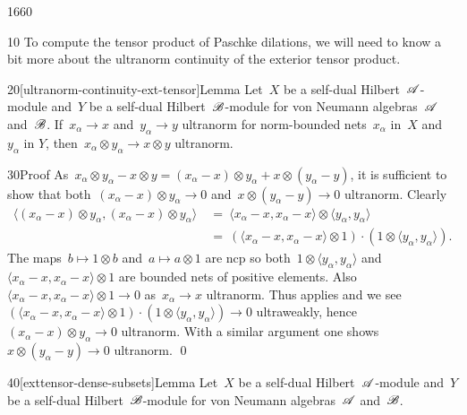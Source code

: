 \begin{parsec}{1660}%
\begin{point}{10}%
To compute the tensor product of Paschke dilations,
    we will need to know a bit more about
    the ultranorm continuity of the exterior tensor product.
\end{point}
\begin{point}{20}[ultranorm-continuity-ext-tensor]{Lemma}%
Let~$X$ be a self-dual Hilbert~$\mathscr{A}$-module
    and~$Y$ be a self-dual Hilbert~$\mathscr{B}$-module
    for von Neumann algebras~$\mathscr{A}$ and~$\mathscr{B}$.
If~$x_\alpha \to x$ and~$y_\alpha \to y$ ultranorm
    for norm-bounded nets~$x_\alpha$ in~$X$ and~$y_\alpha$ in $Y$,
    then~$x_\alpha \otimes y_\alpha \to x \otimes y$ ultranorm.
\begin{point}{30}{Proof}%
As~$x_\alpha \otimes y_\alpha - x \otimes y
            = (x_\alpha -x )\otimes y_\alpha + x\otimes (y_\alpha - y)$,
            it is sufficient
    to show that both~$(x_\alpha -x) \otimes y_\alpha \to 0$
    and~$x\otimes (y_\alpha - y) \to 0$ ultranorm.
Clearly
\begin{align*}
    \langle (x_\alpha - x) \otimes y_\alpha,
        (x_\alpha - x) \otimes y_\alpha \rangle
    & \ = \ 
    \langle x_\alpha - x , x_\alpha - x \rangle\otimes 
    \langle y_\alpha ,y_\alpha \rangle \\
    & \ = \ 
    (\langle x_\alpha - x , x_\alpha - x \rangle\otimes 1) \cdot (1 \otimes 
    \langle y_\alpha ,y_\alpha \rangle ).
\end{align*}
The maps~$b \mapsto 1 \otimes b$ and~$a \mapsto a \otimes 1$
    are ncp %
    so both~$1 \otimes \langle y_\alpha, y_\alpha \rangle$
    and~$\langle x_\alpha - x , x_\alpha - x \rangle\otimes 1$
    are bounded nets of positive elements.
    Also~$\langle x_\alpha - x , x_\alpha - x \rangle\otimes 1 \to 0$
        as~$x_\alpha \to x$ ultranorm.
Thus \sref{vanishing-effects} applies and we see
    $(\langle x_\alpha - x , x_\alpha - x \rangle\otimes 1) \cdot (1 \otimes 
    \langle y_\alpha ,y_\alpha \rangle ) \to 0$ ultraweakly,
    hence~$(x_\alpha - x) \otimes y_\alpha \to 0$ ultranorm.
With a similar argument
    one shows~$x\otimes (y_\alpha - y) \to 0$ ultranorm. \qed
\end{point}
\end{point}
\begin{point}{40}[exttensor-dense-subsets]{Lemma}%
Let~$X$ be a self-dual Hilbert~$\mathscr{A}$-module
    and~$Y$ be a self-dual Hilbert~$\mathscr{B}$-module
    for von Neumann algebras~$\mathscr{A}$ and~$\mathscr{B}$.

\end{point}
\end{parsec}
